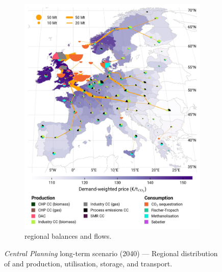\documentclass[preprint,12pt,sort&compress]{elsarticle}
\begin{document}
\begin{figure}[htbp]
\begin{subfigure}[t]{0.49\textwidth}
      \includegraphics[width=1\textwidth]{maps/greenfield-pipelines/base_s_adm___2040-balance_map_co2_stored} 
      \vspace{-0.7cm}
      \caption{ regional balances and flows.}
      \label{fig:CP_lt_2040_co2}
  \end{subfigure}
  \caption{\textit{Central Planning} long-term scenario (2040) --- Regional distribution of  and  production, utilisation, storage, and transport.}
  \label{fig:CP_lt_2040}
\end{figure}
\end{document}
